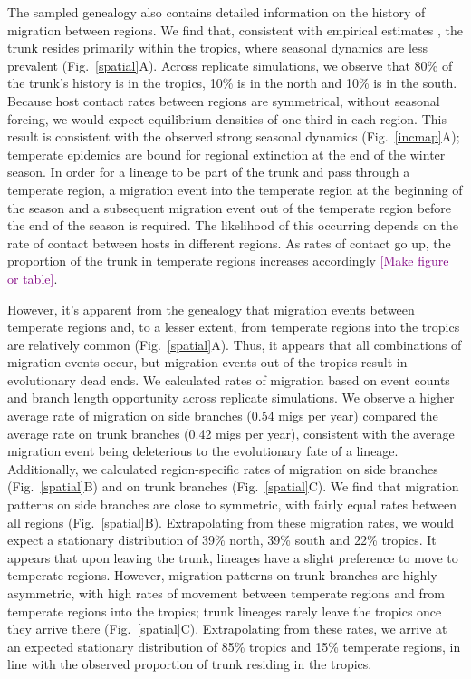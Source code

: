 \documentclass[11pt,oneside,letterpaper]{article}
\def\tbc#1{\textcolor{purple}{[#1]}}
\begin{document}
The sampled genealogy also contains detailed information on the history of migration between regions.  We find that, consistent with empirical estimates \cite{Russell08,Bedford10}, the trunk resides primarily within the tropics, where seasonal dynamics are less prevalent (Fig.~\ref{spatial}A).  Across replicate simulations, we observe that 80\% of the trunk's history is in the tropics, 10\% is in the north and 10\% is in the south.  Because host contact rates between regions are symmetrical, without seasonal forcing, we would expect equilibrium densities of one third in each region.  This result is consistent with the observed strong seasonal dynamics (Fig.~\ref{incmap}A); temperate epidemics are bound for regional extinction at the end of the winter season.  In order for a lineage to be part of the trunk and pass through a temperate region, a migration event into the temperate region at the beginning of the season and a subsequent migration event out of the temperate region before the end of the season is required.  The likelihood of this occurring depends on the rate of contact between hosts in different regions.  As rates of contact go up, the proportion of the trunk in temperate regions increases accordingly \tbc{Make figure or table}.

However, it's apparent from the genealogy that migration events between temperate regions and, to a lesser extent, from temperate regions into the tropics are relatively common (Fig.~\ref{spatial}A).  Thus, it appears that all combinations of migration events occur, but migration events out of the tropics result in evolutionary dead ends.  We calculated rates of migration based on event counts and branch length opportunity across replicate simulations.  We observe a higher average rate of migration on side branches (0.54 migs per year) compared the average rate on trunk branches (0.42 migs per year), consistent with the average migration event being deleterious to the evolutionary fate of a lineage.  Additionally, we calculated region-specific rates of migration on side branches (Fig.~\ref{spatial}B) and on trunk branches (Fig.~\ref{spatial}C).  We find that migration patterns on side branches are close to symmetric, with fairly equal rates between all regions (Fig.~\ref{spatial}B).  Extrapolating from these migration rates, we would expect a stationary distribution of 39\% north, 39\% south and 22\% tropics.  It appears that upon leaving the trunk, lineages have a slight preference to move to temperate regions.  However, migration patterns on trunk branches are highly asymmetric, with high rates of movement between temperate regions and from temperate regions into the tropics; trunk lineages rarely leave the tropics once they arrive there (Fig.~\ref{spatial}C).  Extrapolating from these rates, we arrive at an expected stationary distribution of 85\% tropics and 15\% temperate regions, in line with the observed proportion of trunk residing in the tropics.
\end{document}
